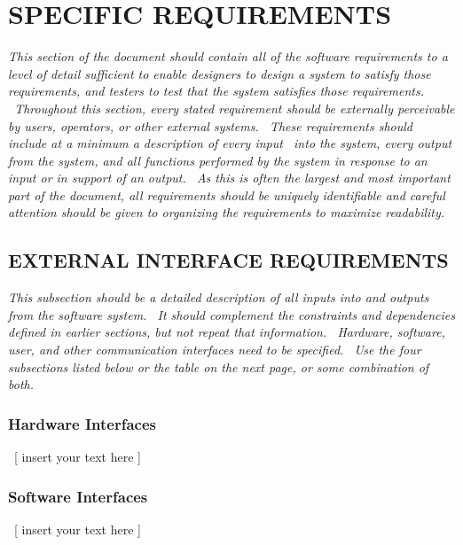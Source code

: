 \documentclass[twoside,letterpaper]{article}
\begin{document}
\clearpage\section[SPECIFIC
REQUIREMENTS]{\rmfamily\bfseries\color{black}
SPECIFIC REQUIREMENTS}
{\itshape\color{black}
This section of the document should contain all of the software
requirements to a level of detail sufficient to enable designers to
design a system to satisfy those requirements, and testers to test that
the system satisfies those requirements. \ Throughout this section,
every stated requirement should be externally perceivable by users,
operators, or other external systems. \ These requirements should
include at a minimum a description of every input \ into the system,
every output from the system, and all functions performed by the system
in response to an input or in support of an output. \ As this is often
the largest and most important part of the document, all requirements
should be uniquely identifiable and careful attention should be given
to organizing the requirements to maximize readability.}

\subsection[EXTERNAL INTERFACE
REQUIREMENTS]{\rmfamily\bfseries\color{black}
EXTERNAL INTERFACE REQUIREMENTS}
{\itshape\color{black}
This subsection should be a detailed description of all inputs into and
outputs from the software system. \ It should complement the
constraints and dependencies defined in earlier sections, but not
repeat that information. \ Hardware, software, user, and other
communication interfaces need to be specified. \ Use the four
subsections listed below or the table on the next page, or some
combination of both.}

\subsubsection[Hardware
Interfaces]{\rmfamily\bfseries\color{black}
Hardware Interfaces}
{\color{black}
\foreignlanguage{english}{\ }\foreignlanguage{english}{[ insert your
text here ]}}

\subsubsection[Software
Interfaces]{\rmfamily\bfseries\color{black}
Software Interfaces}
{\color{black}
\foreignlanguage{english}{\ }\foreignlanguage{english}{[ insert your
text here ]}}
\end{document}
